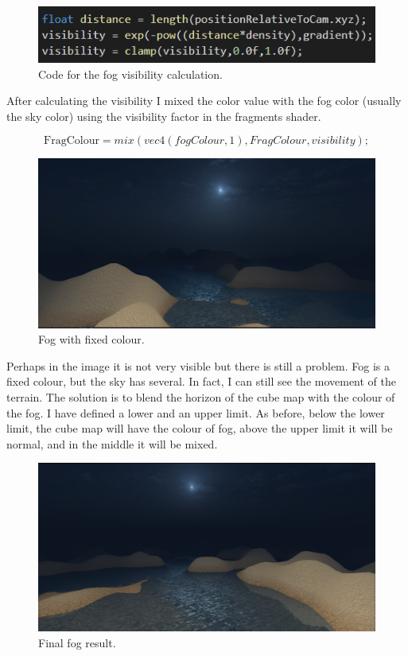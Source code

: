 \begin{figure}[hbt!]
	\centering
	\includegraphics[width= 1
	\textwidth]{images/fog.png}
	\caption{Code for the fog visibility calculation.}
\end{figure}

\noindent
After calculating the visibility I mixed the color value with the fog color (usually the sky color) using the visibility factor in the fragments shader.

\begin{equation}
\text{FragColour} = mix(vec4(fogColour,1), FragColour, visibility);
\end{equation}

\newpage

\begin{figure}[hbt!]
	\centering
	\includegraphics[width= 0.9
	\textwidth]{images/fog1.png}
	\caption{Fog with fixed colour.}
\end{figure}

\noindent
Perhaps in the image it is not very visible but there is still a problem. Fog is a fixed colour, but the sky has several. In fact, I can still see the movement of the terrain. The solution is to blend the horizon of the cube map with the colour of the fog. I have defined a lower and an upper limit. As before, below the lower limit, the cube map will have the colour of fog, above the upper limit it will be normal, and in the middle it will be mixed.

\begin{figure}[hbt!]
	\centering
	\includegraphics[width= 0.9
	\textwidth]{images/fog2.png}
	\caption{Final fog result.}
\end{figure}

